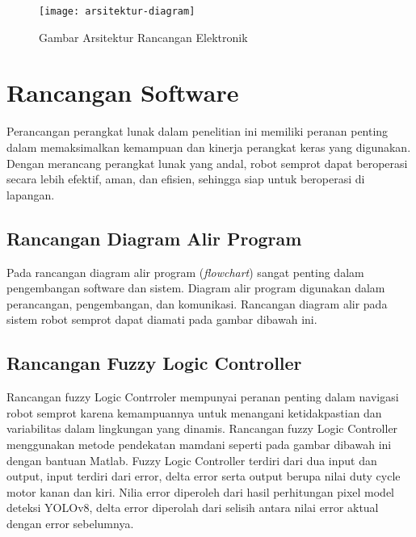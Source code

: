 \begin{figure}[H]
	\centering
	\texttt{[image: arsitektur-diagram]}
	\caption{Gambar Arsitektur Rancangan Elektronik}
	\label{fig:arsitektur-diagram}
\end{figure}
 
\section{Rancangan Software}
Perancangan perangkat lunak dalam penelitian ini memiliki peranan penting dalam memaksimalkan kemampuan dan kinerja perangkat keras yang digunakan. Dengan merancang perangkat lunak yang andal, robot semprot dapat beroperasi secara lebih efektif, aman, dan efisien, sehingga siap untuk beroperasi di lapangan.

\subsection{Rancangan Diagram Alir Program}
Pada rancangan diagram alir program (\textit{flowchart}) sangat penting dalam pengembangan software dan sistem. Diagram alir program digunakan dalam perancangan, pengembangan, dan komunikasi. Rancangan diagram alir pada sistem robot semprot dapat diamati pada gambar dibawah ini.
 
\subsection{Rancangan Fuzzy Logic Controller}
Rancangan fuzzy Logic Contrroler mempunyai peranan penting dalam navigasi robot semprot karena kemampuannya untuk menangani ketidakpastian dan variabilitas dalam lingkungan yang dinamis. Rancangan fuzzy Logic Controller menggunakan metode pendekatan mamdani seperti pada gambar dibawah ini dengan bantuan Matlab. Fuzzy Logic Controller terdiri dari dua input dan output, input terdiri dari error, delta error serta output berupa nilai duty cycle motor kanan dan kiri. Nilia error diperoleh dari hasil perhitungan pixel model deteksi YOLOv8, delta error diperolah dari selisih antara nilai error aktual dengan error sebelumnya. 


